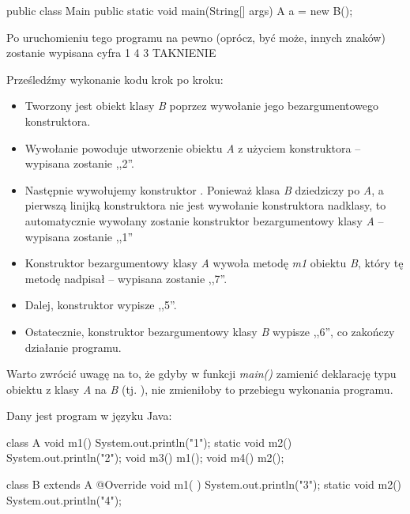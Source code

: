 \begin{solutions}
\begin{java}
        public class Main {
            public static void main(String[] args) {
                A a = new B();
            }
        }
    \end{java}
    Po uruchomieniu tego programu na pewno (oprócz, być może, innych znaków) zostanie wypisana cyfra
    \answerss
    {1}
    {4}
    {3}
    {TAK}{NIE}{NIE}

    Prześledźmy wykonanie kodu krok po kroku:
    \begin{itemize}
        \item Tworzony jest obiekt klasy \textit{B} poprzez wywołanie jego bezargumentowego konstruktora.
        
        \item Wywołanie  powoduje utworzenie obiektu \textit{A} z użyciem konstruktora  -- wypisana zostanie ,,2''.

        \item Następnie wywołujemy konstruktor . Ponieważ klasa \textit{B} dziedziczy po \textit{A}, a pierwszą linijką konstruktora nie jest wywołanie konstruktora nadklasy, to automatycznie wywołany zostanie konstruktor bezargumentowy klasy \textit{A} -- wypisana zostanie ,,1''

        \item Konstruktor bezargumentowy klasy \textit{A} wywoła metodę \textit{m1} obiektu \textit{B}, który tę metodę nadpisał -- wypisana zostanie ,,7''.

        \item Dalej, konstruktor  wypisze ,,5''.

        \item Ostatecznie, konstruktor bezargumentowy klasy \textit{B} wypisze ,,6'', co zakończy działanie programu.
    \end{itemize}

    Warto zwrócić uwagę na to, że gdyby w funkcji \textit{main()} zamienić deklarację typu obiektu z klasy \textit{A} na \textit{B} (tj. ), nie zmieniłoby to przebiegu wykonania programu.

    \sol Dany jest program w języku Java:
    \begin{java}
        class A {
          void m1() { System.out.println("1"); }
          static void m2() { System.out.println("2"); }
          void m3() { m1(); }
          void m4() { m2(); }
        }
        
        class B extends A {
          @Override
          void m1( ) { System.out.println("3"); }
          static void m2() { System.out.println("4"); }
        }
    

\end{java}
\end{solutions}
